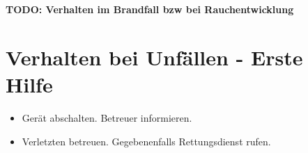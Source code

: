 \documentclass[fontsize=11pt]{scrartcl}
\newcommand{\todo}[1]{\textbf{\color{red}TODO: #1 }}
\begin{document}
\todo{Verhalten im Brandfall bzw bei Rauchentwicklung}

\section{Verhalten bei Unfällen - Erste Hilfe}
\begin{itemize}
	\item Gerät abschalten. Betreuer informieren. 
	\item Verletzten betreuen. Gegebenenfalls Rettungsdienst rufen.
\end{itemize}
\end{document}
